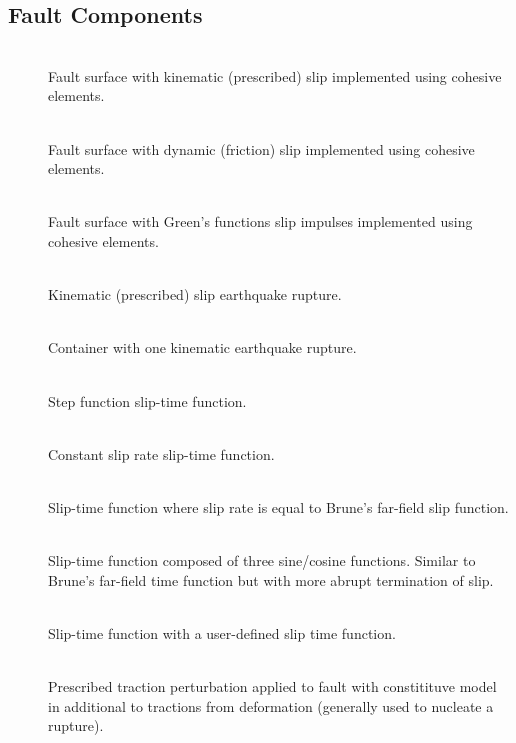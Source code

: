 \subsection{Fault Components}
\begin{description}
\item [] \\
Fault surface with kinematic (prescribed) slip implemented using cohesive
elements.
\item [] \\
Fault surface with dynamic (friction) slip implemented using cohesive
elements.
\item [] \\
Fault surface with Green's functions slip impulses implemented using
cohesive elements.
\item [] \\
Kinematic (prescribed) slip earthquake rupture.
\item [] \\
Container with one kinematic earthquake rupture.
\item [] \\
Step function slip-time function.
\item [] \\
Constant slip rate slip-time function.
\item [] \\
Slip-time function where slip rate is equal to Brune's far-field slip
function.
\item [] \\
Slip-time function composed of three sine/cosine functions. Similar
to Brune's far-field time function but with more abrupt termination
of slip.
\item [] \\
Slip-time function with a user-defined slip time function.
\item [] \\
Prescribed traction perturbation applied to fault with constitituve
model in additional to tractions from deformation (generally used
to nucleate a rupture).
\end{description}

